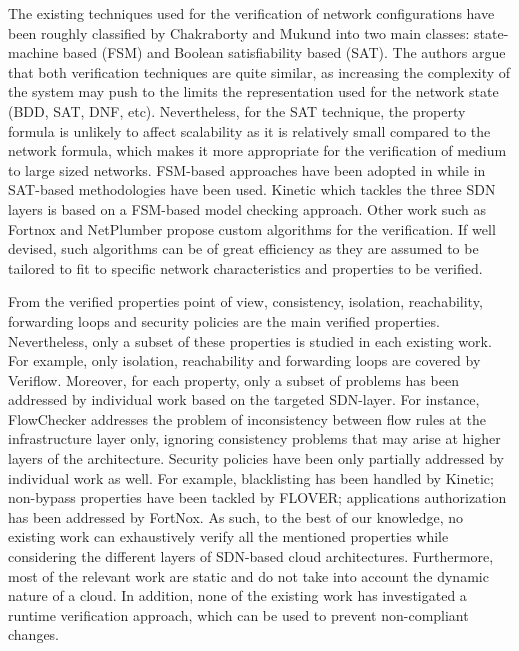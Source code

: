 \documentclass[12pt]{article}
\begin{document}
The existing techniques used for the verification of network
configurations have been roughly classified by Chakraborty and Mukund
\cite{Chakraborty2012} into two main classes: state-machine based
(FSM) and Boolean satisfiability based (SAT). The authors argue that
both verification techniques are quite similar, as increasing the
complexity of the system may push to the limits the representation
used for the network state (BDD, SAT, DNF, etc). Nevertheless, for the
SAT technique, the property formula is unlikely to affect scalability
as it is relatively small compared to the network formula, which makes
it more appropriate for the verification of medium to large sized
networks. FSM-based approaches have been adopted in
\cite{Al-Shaer:2010:FCA:1866898.1866905,Kazemian:2013:RTN:2482626.2482638,Wang2013}
while in
\cite{McGeer:2012:SEU:2342441.2342454,Mai:2011:DDP:2043164.2018470,FLOVERICC13}
SAT-based methodologies have been used. Kinetic
\cite{Reitblatt:2011:CUS:2070562.2070569} which tackles the three SDN
layers is based on a FSM-based model checking approach. Other work
such as Fortnox\cite{Porras:2012:SEK:2342441.2342466} and NetPlumber
\cite{Kazemian:2013:RTN:2482626.2482638} propose custom algorithms for
the verification. If well devised, such algorithms can be of great
efficiency as they are assumed to be tailored to fit to specific
network characteristics and properties to be verified.

From the verified properties point of view, consistency, isolation,
reachability, forwarding loops and security policies are the main
verified properties. Nevertheless, only a subset of these properties
is studied in each existing work. For example, only isolation,
reachability and forwarding loops are covered by Veriflow. Moreover,
for each property, only a subset of problems has been addressed by
individual work based on the targeted SDN-layer. For instance,
FlowChecker addresses the problem of inconsistency between flow rules
at the infrastructure layer only, ignoring consistency problems that
may arise at higher layers of the architecture. Security policies have
been only partially addressed by individual work as well. For example,
blacklisting has been handled by Kinetic; non-bypass properties have
been tackled by FLOVER; applications authorization has been addressed
by FortNox. As such, to the best of our knowledge, no existing work
can exhaustively verify all the mentioned properties while considering
the different layers of SDN-based cloud architectures. Furthermore,
most of the relevant work \cite{Al-Shaer:2010:FCA:1866898.1866905,
  Khurshid:2012:VVN:2342441.2342452, McGeer:2012:SEU:2342441.2342454,
  Reitblatt:2011:CUS:2070562.2070569} are static and do not take into
account the dynamic nature of a cloud. In addition, none of the
existing work has investigated a runtime verification approach, which
can be used to prevent non-compliant changes.
\end{document}
